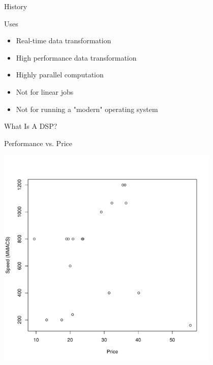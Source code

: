 \documentclass{beamer}
\begin{document}
\begin{frame}{History}
\end{frame}

\begin{frame}{Uses}
    \begin{itemize}
        \item Real-time data transformation %
        \item High performance data transformation %
        \item Highly parallel computation %
        \item Not for linear jobs %
        \item Not for running a "modern" operating system %
    \end{itemize}
\end{frame}

\begin{frame}{What Is A DSP?}
\end{frame}

\begin{frame}{Performance vs. Price}
    \begin{center}
        \includegraphics[width=0.8\textwidth]{price_perf.pdf}
    \end{center}
\end{frame}
\end{document}
